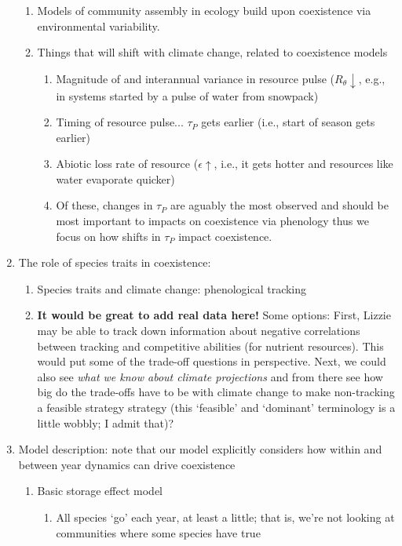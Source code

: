 \documentclass[11pt,letterpaper]{article}
\begin{document}
\begin{enumerate}
\begin{enumerate}
\item Models of community assembly in ecology build upon coexistence  via environmental variability. 
\item Things that will shift with climate change, related to
  coexistence models
\begin{enumerate}
\item Magnitude of and interannual variance in resource pulse ($R_{\theta} \downarrow$, e.g., in systems started by a pulse of water from snowpack)
\item Timing of resource pulse... $\tau_{P}$ gets earlier (i.e., start of season gets earlier)
\item Abiotic loss rate of resource ($\epsilon \uparrow$, i.e., it gets hotter and resources like water evaporate quicker)
\item Of these, changes in $\tau_{P}$ are aguably the most observed and should be most important to impacts on coexistence via phenology thus we focus on how shifts in $\tau_{P}$ impact coexistence.
\end{enumerate}
\end{enumerate}
\item The role of species traits in coexistence:
\begin{enumerate}
\item Species traits and climate change: phenological tracking
\item {\bf It would be great to add real data here!} Some options: First, Lizzie may be able to track down information about negative correlations between tracking and competitive abilities (for nutrient resources). This would put some of the trade-off questions in perspective. Next, we could also see  \emph{what we know about climate projections} and from there see how big do the trade-offs have to be with climate change to make non-tracking a feasible strategy strategy (this `feasible' and `dominant' terminology is a little wobbly; I admit that)?
\end{enumerate}
\item Model description: note that our model explicitly considers how within and between year dynamics can drive coexistence
\begin{enumerate}
\item Basic storage effect model
\begin{enumerate}
\item All species `go' each year, at least a little; that is, we're
  not looking at communities where some species have true

\end{enumerate}
\end{enumerate}
\end{enumerate}
\end{document}
